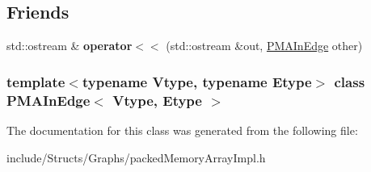 \subsection*{Friends}
\begin{DoxyCompactItemize}
\item 
\hypertarget{class_p_m_a_in_edge_aec8eefa1c370e0e6116bbb6458ef826a}{
std::ostream \& {\bfseries operator$<$$<$} (std::ostream \&out, \hyperlink{class_p_m_a_in_edge}{PMAInEdge} other)}
\label{class_p_m_a_in_edge_aec8eefa1c370e0e6116bbb6458ef826a}

\end{DoxyCompactItemize}
\subsubsection*{template$<$typename Vtype, typename Etype$>$ class PMAInEdge$<$ Vtype, Etype $>$}



The documentation for this class was generated from the following file:\begin{DoxyCompactItemize}
\item 
include/Structs/Graphs/packedMemoryArrayImpl.h\end{DoxyCompactItemize}
